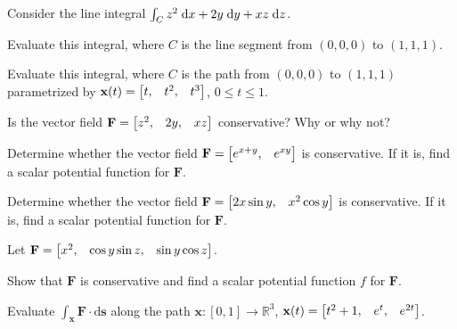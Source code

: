\documentclass[boxes]{gsypset}
\begin{document}
	\begin{problem}[6.3.1]
		Consider the line integral $\int_C z^2 \;\mathrm{d}x + 2y \;\mathrm{d}y + xz \;\mathrm{d}z$.
		\begin{subproblems}
			\subproblem 
				Evaluate this integral, where $C$ is the line segment from $(0, 0, 0)$ to $(1, 1, 1)$.
				\begin{solution}
					
				\end{solution}
			\subproblem 
				Evaluate this integral, where $C$ is the path from $(0, 0, 0)$ to $(1, 1, 1)$ 
				parametrized by $\mathbf{x}(t) = \begin{bmatrix}t, & t^2, & t^3\end{bmatrix}$, $0 \leq t \leq 1$.
				\begin{solution}
					
				\end{solution}
			\subproblem 
				Is the vector field $\mathbf{F} = \begin{bmatrix}z^2, & 2y, & xz\end{bmatrix}$ conservative? Why or why not?
				\begin{solution}
					
				\end{solution}
		\end{subproblems}
	\end{problem}
	
	\begin{problem}[6.3.3]
		Determine whether the vector field $\mathbf{F} = \begin{bmatrix}e^{x+y}, & e^{xy}\end{bmatrix}$ is conservative.
		If it is, find a scalar potential function for $\mathbf{F}$.
	\end{problem}
	\begin{solution}
		
	\end{solution}
	
	\begin{problem}[6.3.4]
		Determine whether the vector field $\mathbf{F} = \begin{bmatrix}2x \sin y, & x^2 \cos y\end{bmatrix}$ is conservative.
		If it is, find a scalar potential function for $\mathbf{F}$.
	\end{problem}
	\begin{solution}
		
	\end{solution}
	
	\begin{problem}[6.3.25]
		Let $\mathbf{F} = \begin{bmatrix}x^2, & \cos y \sin z, & \sin y \cos z\end{bmatrix}$.
		\begin{subproblems}
			\subproblem 
				Show that $\mathbf{F}$ is conservative and 
				find a scalar potential function $f$ for $\mathbf{F}$.
				\begin{solution}
					
				\end{solution}
			\subproblem 
				Evaluate $\int_\mathbf{x}\mathbf{F} \cdot \mathrm{d}\mathbf{s}$
				along the path $\mathbf{x}: [0,1] \to \mathbb{R}^3$,
				$\mathbf{x}(t) = \begin{bmatrix}t^2 + 1, & e^t, & e^{2t}\end{bmatrix}$.
				\begin{solution}
					
				\end{solution}
		\end{subproblems}
	\end{problem}
	
\end{document}
